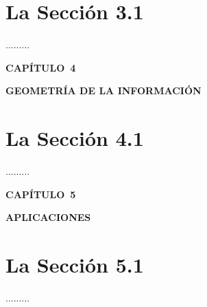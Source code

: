 \documentclass[10pt]{article}
\begin{document}
\vspace{1.5pt}
\section{La Secci\'on 3.1}
\label{s:3.1}

.........


\newpage


{\LARGE
\noindent \textbf{CAP\'ITULO~4}

\noindent \textbf{GEOMETR\'IA DE LA INFORMACI\'ON}
} 


\vspace{1.5pt}
\section{La Secci\'on 4.1}
\label{s:4.1}

.........


\newpage

{\LARGE
\noindent \textbf{CAP\'ITULO~5}

\noindent \textbf{APLICACIONES}
} 


\vspace{1.5pt}
\section{La Secci\'on 5.1}
\label{s:5.1}

.........
\end{document}
